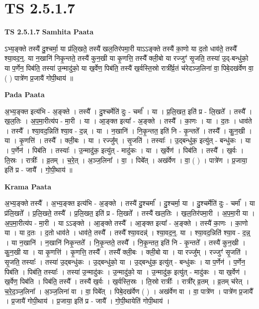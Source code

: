 \documentclass[17pt]{extarticle}
\begin{document}
\section{ TS 2.5.1.7 }

\textbf{TS 2.5.1.7 } \newline
\textbf{Samhita Paata} \newline

ऽभ्य॒ङ्क्ते तस्यै॑ दु॒श्चर्मा॒ या प्र॑लि॒खते॒ तस्यै॑ खल॒तिर॑पमा॒री याऽऽङ्क्ते तस्यै॑ का॒णो या द॒तो धाव॑ते॒ तस्यै᳚ श्या॒वद॒न्॒. या न॒खानि॑ निकृ॒न्तते॒ तस्यै॑ कुन॒खी या कृ॒णत्ति॒ तस्यै᳚ क्ली॒बो या रज्जुꣳ॑ सृ॒जति॒ तस्या॑ उ॒द्-बन्धु॑को॒ या प॒र्णेन॒ पिब॑ति॒ तस्या॑ उ॒न्मादु॑को॒ या ख॒र्वेण॒ पिब॑ति॒ तस्यै॑ ख॒र्वस्ति॒स्रो रात्री᳚र्व्र॒तं च॑रेदञ्ज॒लिना॑ वा॒ पिबे॒दख॑र्वेण वा॒ ( ) पात्रे॑ण प्र॒जायै॑ गोपी॒थाय॑ ॥ \newline

\textbf{Pada Paata} \newline

अ॒भ्य॒ङ्क्त इत्य॑भि - अ॒ङ्क्ते । तस्यै᳚ । दु॒श्चर्मेति॑ दुः - चर्मा᳚ । या । प्र॒लि॒खत॒ इति॑ प्र - लि॒खते᳚ । तस्यै᳚ । ख॒ल॒तिः । अ॒प॒मा॒रीत्य॑प - मा॒री । या । आ॒ङ्क्त इत्या᳚ - अ॒ङ्क्ते । तस्यै᳚ । का॒णः । या । द॒तः । धाव॑ते । तस्यै᳚ । श्या॒वद॒न्निति॑ श्या॒व - द॒न्न् । या । न॒खानि॑ । नि॒कृ॒न्तत॒ इति॑ नि - कृ॒न्तते᳚ । तस्यै᳚ । कु॒न॒खी । या । कृ॒णत्ति॑ । तस्यै᳚ । क्ली॒बः । या । रज्जु᳚म् । सृ॒जति॑ । तस्याः᳚ । उ॒द्बन्धु॑क॒ इत्यु॑त् - बन्धु॑कः । या । प॒र्णेन॑ । पिब॑ति । तस्याः᳚ । उ॒न्मादु॑क॒ इत्यु॑त् - मादु॑कः । या । ख॒र्वेण॑ । पिब॑ति । तस्यै᳚ । ख॒र्वः । ति॒स्रः । रात्रीः᳚ । व्र॒तम् । च॒रे॒त् । अ॒ञ्ज॒लिना᳚ । वा॒ । पिबे᳚त् । अख॑र्वेण । वा॒ ( ) । पात्रे॑ण । प्र॒जाया॒ इति॑ प्र - जायै᳚ । गो॒पी॒थाय॑ ॥  \newline


\textbf{Krama Paata} \newline

अ॒भ्य॒ङ्क्ते तस्यै᳚ । अ॒भ्य॒ङ्क्त इत्य॑भि - अ॒ङ्क्ते । तस्यै॑ दु॒श्चर्मा᳚ । दु॒श्चर्मा॒ या । दु॒श्चर्मेति॑ दुः - चर्मा᳚ । या प्र॑लि॒खते᳚ । प्र॒लि॒खते॒ तस्यै᳚ । प्र॒लि॒खत॒ इति॑ प्र - लि॒खते᳚ । तस्यै॑ खल॒तिः । ख॒ल॒तिर॑पमा॒री । अ॒प॒मा॒री या । अ॒प॒मा॒रीत्य॑प - मा॒री । या ऽऽङ्क्ते । आ॒ङ्क्ते तस्यै᳚ । आ॒ङ्क्त इत्या᳚ - अ॒ङ्क्ते । तस्यै॑ का॒णः । का॒णो या । या द॒तः । द॒तो धाव॑ते । धाव॑ते॒ तस्यै᳚ । तस्यै᳚ श्या॒वदन्न्॑ । श्या॒वद॒न्॒. या । श्या॒वद॒न्निति॑ श्या॒व - द॒न्न्॒ । या न॒खानि॑ । न॒खानि॑ निकृ॒न्तते᳚ । नि॒कृ॒न्तते॒ तस्यै᳚ । नि॒कृ॒न्तत॒ इति॑ नि - कृ॒न्तते᳚ । तस्यै॑ कुन॒खी । कु॒न॒खी या । या कृ॒णत्ति॑ । कृ॒णत्ति॒ तस्यै᳚ । तस्यै᳚ क्ली॒बः । क्ली॒बो या । या रज्जु᳚म् । रज्जुꣳ॑ सृ॒जति॑ । सृ॒जति॒ तस्याः᳚ । तस्या॑ उ॒द्बन्धु॑कः । उ॒द्बन्धु॑को॒ या । उ॒द्बन्धु॑क॒ इत्यु॑त् - बन्धु॑कः । या प॒र्णेन॑ । प॒र्णेन॒ पिब॑ति । पिब॑ति॒ तस्याः᳚ । तस्या॑ उ॒न्मादु॑कः । उ॒न्मादु॑को॒ या । उ॒न्मादु॑क॒ इत्यु॑त् - मादु॑कः । या ख॒र्वेण॑ । ख॒र्वेण॒ पिब॑ति । पिब॑ति॒ तस्यै᳚ । तस्यै॑ ख॒र्वः । ख॒र्वस्ति॒स्रः । ति॒स्रो रात्रीः᳚ । रात्री᳚र् व्र॒तम् । व्र॒तम् च॑रेत् । च॒रे॒द॒ञ्ज॒लिना᳚ । अ॒ञ्ज॒लिना॑ वा । वा॒ पिबे᳚त् । पिबे॒दख॑र्वेण ( ) । अख॑र्वेण वा । वा॒ पात्रे॑ण । पात्रे॑ण प्र॒जायै᳚ । प्र॒जायै॑ गोपी॒थाय॑ । प्र॒जाया॒ इति॑ प्र - जायै᳚ । गो॒पी॒थायेति॑ गोपी॒थाय॑ । \newline
\end{document}

